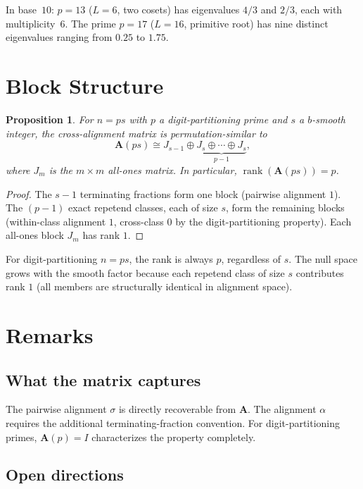 \documentclass[12pt]{amsart}
\newtheorem{proposition}[theorem]{Proposition}
\theoremstyle{definition}
\theoremstyle{remark}
\begin{document}
In base~$10$: $p = 13$ ($L = 6$, two cosets) has eigenvalues
$4/3$ and $2/3$, each with multiplicity~$6$. The prime $p = 17$
($L = 16$, primitive root) has nine distinct eigenvalues ranging
from $0.25$ to $1.75$.

\section{Block Structure}

\begin{proposition}\label{prop:block}
For $n = ps$ with $p$ a digit-partitioning prime and
$s$ a $b$-smooth integer, the cross-alignment matrix is
permutation-similar to
\[
\mathbf{A}(ps) \cong J_{s-1} \oplus
\underbrace{J_s \oplus \cdots \oplus J_s}_{p-1},
\]
where $J_m$ is the $m \times m$ all-ones matrix.
In particular, $\operatorname{rank}(\mathbf{A}(ps)) = p$.
\end{proposition}

\begin{proof}
The $s - 1$ terminating fractions form one block
(pairwise alignment $1$). The $(p{-}1)$ exact
repetend classes, each of size $s$, form the remaining
blocks (within-class alignment $1$, cross-class $0$
by the digit-partitioning property). Each all-ones
block $J_m$ has rank $1$.
\end{proof}

For digit-partitioning $n = ps$, the rank is always $p$,
regardless of $s$. The null space grows with the smooth
factor because each repetend class of size $s$ contributes
rank $1$ (all members are structurally identical in
alignment space).


\section{Remarks}

\subsection*{What the matrix captures}

The pairwise alignment $\sigma$ is directly recoverable
from $\mathbf{A}$. The alignment $\alpha$ requires the
additional terminating-fraction convention. For
digit-partitioning primes, $\mathbf{A}(p) = I$
characterizes the property completely.


\subsection*{Open directions}
\end{document}
